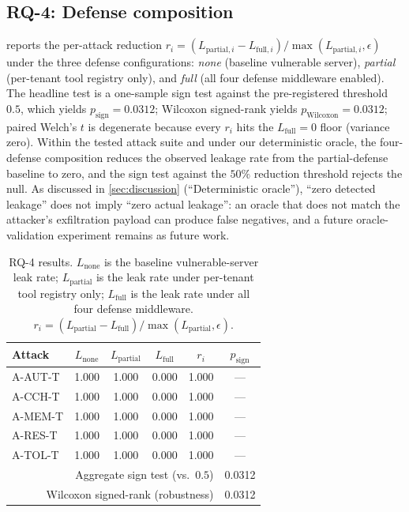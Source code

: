 \documentclass[sigconf, anonymous, natbib=false]{acmart}
\begin{document}
\subsection{RQ-4: Defense composition}

 reports the per-attack reduction
$r_i = (L_{\text{partial},i} - L_{\text{full},i}) /
\max(L_{\text{partial},i}, \epsilon)$ under the
three defense configurations: \emph{none} (baseline
vulnerable server), \emph{partial} (per-tenant tool
registry only), and \emph{full} (all four defense
middleware enabled). The headline test is a one-sample
sign test against the pre-registered threshold $0.5$,
which yields $p_{\text{sign}} = 0.0312$; Wilcoxon
signed-rank yields $p_{\text{Wilcoxon}} = 0.0312$; paired
Welch's $t$ is degenerate because every $r_i$ hits the
$L_{\text{full}} = 0$ floor (variance zero). Within the
tested attack suite and under our deterministic oracle, the
four-defense composition reduces the observed leakage rate
from the partial-defense baseline to zero, and the sign
test against the $50\%$ reduction threshold rejects the
null. As discussed in \cref{sec:discussion} (``Deterministic
oracle''), ``zero detected leakage'' does not imply
``zero actual leakage'': an oracle that does not match the
attacker's exfiltration payload can produce false
negatives, and a future oracle-validation experiment
remains as future work.

\begin{table}[t]
\caption{RQ-4 results. $L_{\text{none}}$ is the baseline
vulnerable-server leak rate; $L_{\text{partial}}$ is the
leak rate under per-tenant tool registry only;
$L_{\text{full}}$ is the leak rate under all four defense
middleware. $r_i = (L_{\text{partial}} - L_{\text{full}})
/ \max(L_{\text{partial}}, \epsilon)$.}
\label{tab:rq4}
\centering
\small
\begin{tabularx}{\linewidth}{X c c c c c}
\toprule
Attack & $L_{\text{none}}$ & $L_{\text{partial}}$
      & $L_{\text{full}}$ & $r_i$
      & $p_{\text{sign}}$ \\
\midrule
A-AUT-T & 1.000 & 1.000 & 0.000 & 1.000 & --- \\
A-CCH-T & 1.000 & 1.000 & 0.000 & 1.000 & --- \\
A-MEM-T & 1.000 & 1.000 & 0.000 & 1.000 & --- \\
A-RES-T & 1.000 & 1.000 & 0.000 & 1.000 & --- \\
A-TOL-T & 1.000 & 1.000 & 0.000 & 1.000 & --- \\
\midrule
\multicolumn{5}{r}{Aggregate sign test (vs.\ $0.5$)}
        & 0.0312 \\
\multicolumn{5}{r}{Wilcoxon signed-rank (robustness)}
        & 0.0312 \\
\bottomrule
\end{tabularx}
\end{table}
\end{document}
